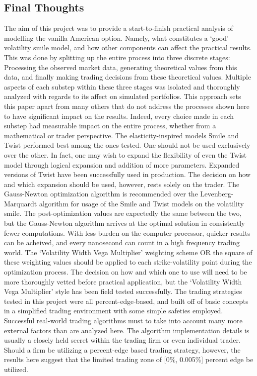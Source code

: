 \documentclass[12pt, a4paper, notitlepage]{article}
\numberwithin{equation}{subsection}
\numberwithin{figure}{subsection}
\numberwithin{table}{subsection}
\newcommand{\newpar}{\newline \newline}
\begin{document}
\subsection{Final Thoughts}
The aim of this project was to provide a start-to-finish practical analysis of modelling the vanilla American option.  Namely, what constitutes a `good' volatility smile model, and how other components can affect the practical results.  This was done by splitting up the entire process into three discrete stages:  Processing the observed market data, generating theoretical values from this data, and finally making trading decisions from these theoretical values.  Multiple aspects of each substep within these three stages was isolated and thoroughly analyzed with regards to its affect on simulated portfolios.  This approach sets this paper apart from many others that do not address the processes shown here to have significant impact on the results.  Indeed, every choice made in each substep had measurable impact on the entire process, whether from a mathematical or trader perspective.
\newpar
The elasticity-inspired models Smile and Twist performed best among the ones tested.  One should not be used exclusively over the other.  In fact, one may wish to expand the flexibility of even the Twist model through logical expansion and addition of more parameters.  Expanded versions of Twist have been successfully used in production.  The decision on how and which expansion should be used, however, rests solely on the trader.
\newpar
The Gauss-Newton optimization algorithm is recommended over the Levenberg-Marquardt algorithm for usage of the Smile and Twist models on the volatility smile.  The post-optimization values are expectedly the same between the two, but the Gauss-Newton algorithm arrives at the optimal solution in consistently fewer computations.  With less burden on the computer processor, quicker results can be acheived, and every nanosecond can count in a high frequency trading world.
\newpar
The `Volatility Width Vega Multiplier' weighting scheme OR the square of these weighting values should be applied to each strike-volatility point during the optimization process.  The decision on how and which one to use will need to be more thoroughly vetted before practical application, but the `Volatility Width Vega Multiplier' style has been field tested successfully.
\newpar
The trading strategies tested in this project were all percent-edge-based, and built off of basic concepts in a simplified trading environment with some simple safeties employed.  Successful real-world trading algorithms must to take into account many more external factors than are analyzed here.  The algorithm implementation details is usually a closely held secret within the trading firm or even individual trader.  Should a firm be utilizing a percent-edge based trading strategy, however, the results here suggest that the limited trading zone of [0\%, 0.005\%] percent edge be utilized.
\end{document}
